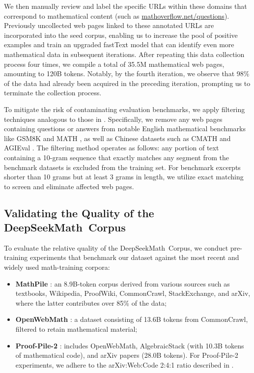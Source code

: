 We then manually review and label the specific URLs within these domains that correspond to mathematical content (such as \url{mathoverflow.net/questions}). Previously uncollected web pages linked to these annotated URLs are incorporated into the seed corpus, enabling us to increase the pool of positive examples and train an upgraded fastText model that can identify even more mathematical data in subsequent iterations. After repeating this data collection process four times, we compile a total of 35.5M mathematical web pages, amounting to 120B tokens. Notably, by the fourth iteration, we observe that 98\% of the data had already been acquired in the preceding iteration, prompting us to terminate the collection process.

To mitigate the risk of contaminating evaluation benchmarks, we apply filtering techniques analogous to those in \cite{deepseek-coder}. Specifically, we remove any web pages containing questions or answers from notable English mathematical benchmarks like GSM8K \citep{gsm8k} and MATH \citep{MATH}, as well as Chinese datasets such as CMATH \citep{wei2023cmath} and AGIEval \citep{agieval}. The filtering method operates as follows: any portion of text containing a 10-gram sequence that exactly matches any segment from the benchmark datasets is excluded from the training set. For benchmark excerpts shorter than 10 grams but at least 3 grams in length, we utilize exact matching to screen and eliminate affected web pages.

\subsection{Validating the Quality of the DeepSeekMath~Corpus}

To evaluate the relative quality of the DeepSeekMath~Corpus, we conduct pre-training experiments that benchmark our dataset against the most recent and widely used math-training corpora:

\begin{itemize}[topsep=0pt]
    \item \textbf{MathPile} \citep{mathpile}: an 8.9B-token corpus derived from various sources such as textbooks, Wikipedia, ProofWiki, CommonCrawl, StackExchange, and arXiv, where the latter contributes over 85\% of the data;
    \item \textbf{OpenWebMath} \citep{openwebmath}: a dataset consisting of 13.6B tokens from CommonCrawl, filtered to retain mathematical material;
    \item \textbf{Proof-Pile-2} \citep{llemma}: includes OpenWebMath, AlgebraicStack (with 10.3B tokens of mathematical code), and arXiv papers (28.0B tokens). For Proof-Pile-2 experiments, we adhere to the arXiv:Web:Code 2:4:1 ratio described in \cite{llemma}.
\end{itemize}

